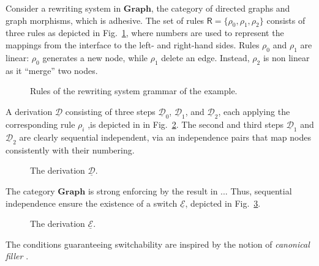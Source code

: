 \documentclass[a4paper,UKenglish,cleveref,pdftex, thm-restate,numberwithinsect,anonymous]{lipics}
\newcommand{\cat}[1]{\ensuremath{\mathbf{#1}}}
\def\R{\mathsf{R}}
\newcommand{\dder}[1]{\mathscr{#1}}
\newcommand{\der}[1]{\underline{\dder{#1}}}
\begin{document}
\begin{example}
  \label{ex:seq-ind}
  Consider a rewriting system in $\cat{Graph}$, the category of
  directed graphs and graph morphisms, which is adhesive. The set of
  rules $\R = \{ \rho_0, \rho_1, \rho_2\}$ consists of three rules as
  depicted in Fig.~\ref{fi:rules}, where numbers are used to represent
  the mappings from the interface to the left- and right-hand
  sides. Rules $\rho_0$ and $\rho_1$ are linear: $\rho_0$ generates a
  new node, while $\rho_1$ delete an edge. Instead, $\rho_2$ is non
  linear as it ``merge'' two nodes.

  \begin{figure}
    
    
    \caption{Rules of the rewriting system grammar of the example.}
    \label{fi:rules}
  \end{figure}
  
  A derivation $\der{D}$ consisting of three steps $\der{D}_0$,
  $\der{D}_1$, and $\der{D}_2$, each applying the corresponding rule
  $\rho_i$ ,is depicted in in Fig.~\ref{fi:derD}. The second and third
  steps $\der{D}_1$ and $\der{D}_2$ are clearly sequential
  independent, via an independence pairs that map nodes consistently
  with their numbering.
  
  \begin{figure}
    
    \caption{The derivation $\der{D}$.}
    \label{fi:derD}
  \end{figure}

  The category $\cat{Graph}$ is strong enforcing by the result in ...  Thus,
  sequential independence ensure the existence of a switch $\der{E}$,
  depicted in Fig.~\ref{fi:derE}.
  \begin{figure}
    
    \caption{The derivation $\der{E}$.}
    \label{fi:derE}
  \end{figure}
\end{example}
\fi 

The conditions guaranteeing switchability are inspired
by the notion of \emph{canonical filler}
\cite{heindel2009category}.
\end{document}
